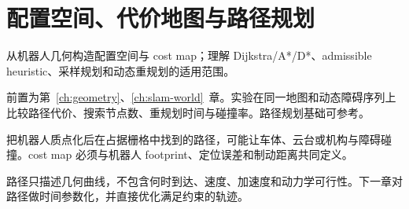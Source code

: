 \chapter{配置空间、代价地图与路径规划}
\label{ch:path-planning}

\begin{learningobjectives}
从机器人几何构造配置空间与 cost map；理解 Dijkstra/A*/D*、admissible heuristic、采样规划和动态重规划的适用范围。
\end{learningobjectives}

\begin{prerequisites}
前置为第~\ref{ch:geometry}、\ref{ch:slam-world}~章。实验在同一地图和动态障碍序列上比较路径代价、搜索节点数、重规划时间与碰撞率。路径规划基础可参考\cite{lavalle2006planning}。
\end{prerequisites}


\begin{failuremode}
把机器人质点化后在占据栅格中找到的路径，可能让车体、云台或机构与障碍碰撞。cost map 必须与机器人 footprint、定位误差和制动距离共同定义。
\end{failuremode}

\begin{chaptertransition}
路径只描述几何曲线，不包含何时到达、速度、加速度和动力学可行性。下一章对路径做时间参数化，并直接优化满足约束的轨迹。
\end{chaptertransition}

